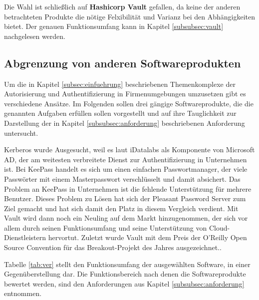 \documentclass[
book,
a4paper,   
titlepage,  
halfparskip,
12pt        
]{scrartcl}
\begin{document}
\begin{onehalfspacing}
Die Wahl ist schließlich auf \textbf{Hashicorp Vault} gefallen, da keine der anderen betrachteten Produkte die nötige Felxibilität und Varianz bei den Abhängigkeiten bietet. Der genauen Funktionsumfang kann in Kapitel \vref{subsubsec:vault} nachgelesen werden.

\subsection{Abgrenzung von anderen Softwareprodukten}
Um die in Kapitel \vref{subsec:einfuehrung} beschriebenen Themenkomplexe der Autorisierung und Authentifizierung in Firmenumgebungen umzusetzen gibt es verschiedene Ansätze. Im Folgenden sollen drei gängige Softwareprodukte, die die genannten Aufgaben erfüllen sollen vorgestellt und auf ihre Tauglichkeit zur Darstellung der in Kapitel \vref{subsubsec:anforderung} beschriebenen Anforderung untersucht.

Kerberos wurde Ausgesucht, weil es laut iDatalabs als Komponente von Microsoft \ac{AD}, der am weitesten verbreitete Dienst zur Authentifizierung in Unternehmen ist\cite{datalabs}. Bei KeePass handelt es sich um einen einfachen Passwortmanager, der viele Passwörter mit einem Masterpasswort verschlüsselt und damit absichert. Das Problem an KeePass in Unternehmen ist die fehlende Unterstützung für mehrere Benutzer. Dieses Problem zu Lösen hat sich der Pleasant Password Server zum Ziel gemacht und hat sich damit den Platz in diesem Vergleich verdient. Mit Vault wird dann noch ein Neuling auf dem Markt hinzugenommen, der sich vor allem durch seinen Funktionsumfang und seine Unterstützung von Cloud-Dienstleistern hervortut. Zuletzt wurde Vault mit dem Preis der O'Reilly Open Source Convention für das Breakout-Projekt des Jahres ausgezeichnet.\cite{award}.

Tabelle \vref{tab:ver} stellt den Funktionsumfang der ausgewählten Software, in einer Gegenüberstellung dar. Die Funktionsbereich nach denen die Softwareprodukte bewertet werden, sind den Anforderungen aus Kapitel \vref{subsubsec:anforderung} entnommen.


\end{onehalfspacing}
\end{document}
